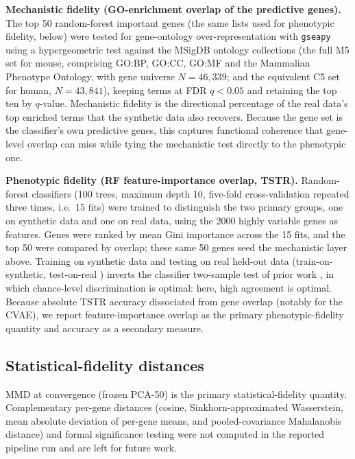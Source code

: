 \documentclass[11pt]{article}
\begin{document}
\noindent\textbf{Mechanistic fidelity (GO-enrichment overlap of the predictive genes).} The top 50 random-forest important genes (the same lists used for phenotypic fidelity, below) were tested for gene-ontology over-representation with \texttt{gseapy} \cite{gseapy} using a hypergeometric test against the MSigDB ontology collections \cite{msigdb} (the full M5 set for mouse, comprising GO:BP, GO:CC, GO:MF and the Mammalian Phenotype Ontology, with gene universe $N=46{,}339$; and the equivalent C5 set for human, $N=43{,}841$), keeping terms at FDR $q<0.05$ and retaining the top ten by $q$-value. Mechanistic fidelity is the directional percentage of the real data's top enriched terms that the synthetic data also recovers. Because the gene set is the classifier's own predictive genes, this captures functional coherence that gene-level overlap can miss while tying the mechanistic test directly to the phenotypic one.

\noindent\textbf{Phenotypic fidelity (RF feature-importance overlap, TSTR).} Random-forest classifiers (100 trees, maximum depth 10, five-fold cross-validation repeated three times, i.e.\ 15 fits) were trained to distinguish the two primary groups, one on synthetic data and one on real data, using the 2000 highly variable genes as features. Genes were ranked by mean Gini importance across the 15 fits, and the top 50 were compared by overlap; these same 50 genes seed the mechanistic layer above. Training on synthetic data and testing on real held-out data (train-on-synthetic, test-on-real \cite{esteban}) inverts the classifier two-sample test of prior work \cite{scgan,scdiffusion,lopezpaz}, in which chance-level discrimination is optimal: here, high agreement is optimal. Because absolute TSTR accuracy dissociated from gene overlap (notably for the CVAE), we report feature-importance overlap as the primary phenotypic-fidelity quantity and accuracy as a secondary measure.

\subsection{Statistical-fidelity distances}
MMD at convergence (frozen PCA-50) is the primary statistical-fidelity quantity. Complementary per-gene distances (cosine, Sinkhorn-approximated Wasserstein, mean absolute deviation of per-gene means, and pooled-covariance Mahalanobis distance) and formal significance testing were not computed in the reported pipeline run and are left for future work.
\end{document}
